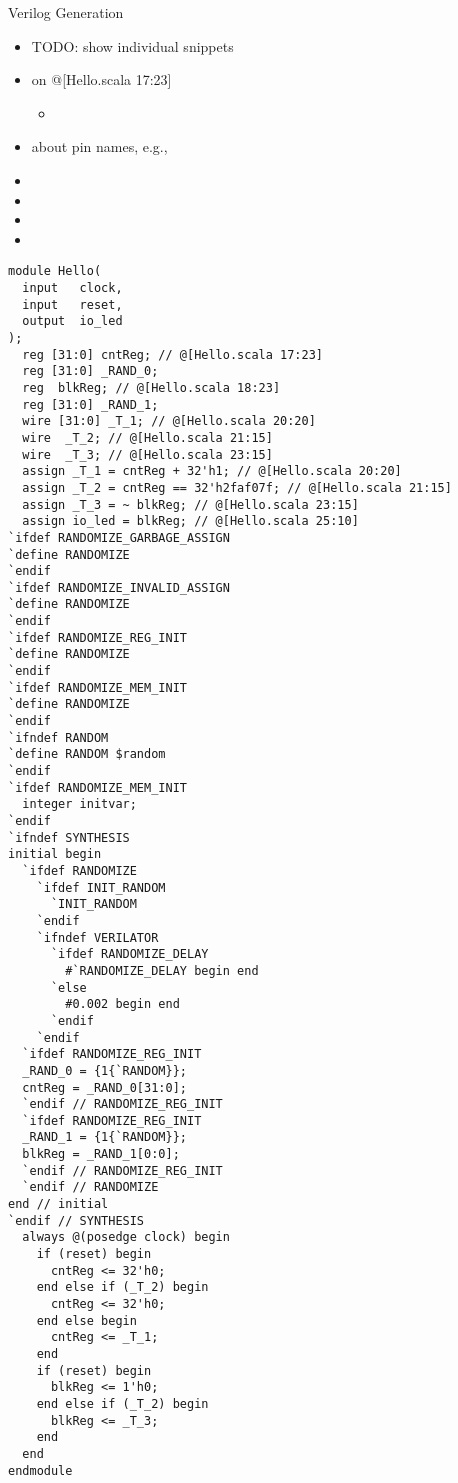 \begin{frame}[fragile]{Verilog Generation}
\begin{itemize}
\item TODO: show individual snippets
\item on @[Hello.scala 17:23]
\begin{itemize}
\item
\end{itemize}
\item about pin names, e.g., 
\item
\item
\item
\item
\end{itemize}
\begin{verbatim}
module Hello(
  input   clock,
  input   reset,
  output  io_led
);
  reg [31:0] cntReg; // @[Hello.scala 17:23]
  reg [31:0] _RAND_0;
  reg  blkReg; // @[Hello.scala 18:23]
  reg [31:0] _RAND_1;
  wire [31:0] _T_1; // @[Hello.scala 20:20]
  wire  _T_2; // @[Hello.scala 21:15]
  wire  _T_3; // @[Hello.scala 23:15]
  assign _T_1 = cntReg + 32'h1; // @[Hello.scala 20:20]
  assign _T_2 = cntReg == 32'h2faf07f; // @[Hello.scala 21:15]
  assign _T_3 = ~ blkReg; // @[Hello.scala 23:15]
  assign io_led = blkReg; // @[Hello.scala 25:10]
`ifdef RANDOMIZE_GARBAGE_ASSIGN
`define RANDOMIZE
`endif
`ifdef RANDOMIZE_INVALID_ASSIGN
`define RANDOMIZE
`endif
`ifdef RANDOMIZE_REG_INIT
`define RANDOMIZE
`endif
`ifdef RANDOMIZE_MEM_INIT
`define RANDOMIZE
`endif
`ifndef RANDOM
`define RANDOM $random
`endif
`ifdef RANDOMIZE_MEM_INIT
  integer initvar;
`endif
`ifndef SYNTHESIS
initial begin
  `ifdef RANDOMIZE
    `ifdef INIT_RANDOM
      `INIT_RANDOM
    `endif
    `ifndef VERILATOR
      `ifdef RANDOMIZE_DELAY
        #`RANDOMIZE_DELAY begin end
      `else
        #0.002 begin end
      `endif
    `endif
  `ifdef RANDOMIZE_REG_INIT
  _RAND_0 = {1{`RANDOM}};
  cntReg = _RAND_0[31:0];
  `endif // RANDOMIZE_REG_INIT
  `ifdef RANDOMIZE_REG_INIT
  _RAND_1 = {1{`RANDOM}};
  blkReg = _RAND_1[0:0];
  `endif // RANDOMIZE_REG_INIT
  `endif // RANDOMIZE
end // initial
`endif // SYNTHESIS
  always @(posedge clock) begin
    if (reset) begin
      cntReg <= 32'h0;
    end else if (_T_2) begin
      cntReg <= 32'h0;
    end else begin
      cntReg <= _T_1;
    end
    if (reset) begin
      blkReg <= 1'h0;
    end else if (_T_2) begin
      blkReg <= _T_3;
    end
  end
endmodule

\end{verbatim}
\end{frame}

